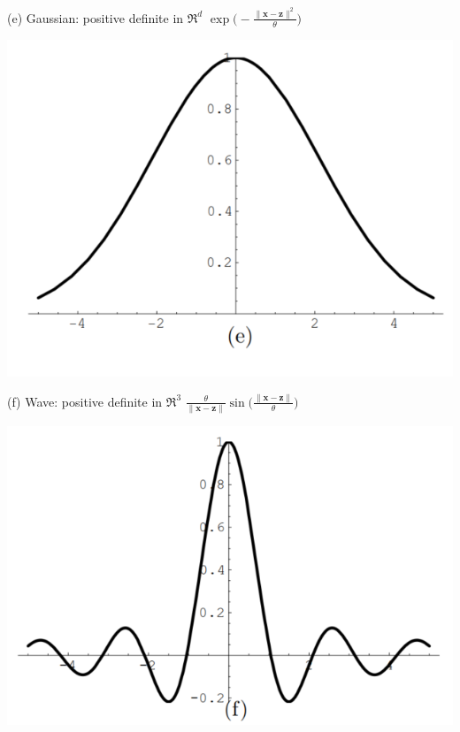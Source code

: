 \documentclass[
  ignorenonframetext,
]{beamer}
\begin{document}
\begin{frame}{}
\protect\hypertarget{section-10}{}
\begin{block}{(e) Gaussian:}
\protect\hypertarget{e-gaussian}{}
positive definite in \(\mathfrak R^d\)
\(\exp \Big(- \frac {\|\pmb x - \pmb z\|^2} \theta \Big)\)

\begin{center}\includegraphics[width=0.5\linewidth]{figure/marc_f2e} \end{center}
\end{block}
\end{frame}

\begin{frame}{}
\protect\hypertarget{section-11}{}
\begin{block}{(f) Wave:}
\protect\hypertarget{f-wave}{}
positive definite in \(\mathfrak R^3\)
\(\frac {\theta} {\|\pmb x - \pmb z\|} \sin \Big(\frac {\|\pmb x - \pmb z\|} \theta \Big)\)

\begin{center}\includegraphics[width=0.5\linewidth]{figure/marc_f2f} \end{center}
\end{block}
\end{frame}
\end{document}
